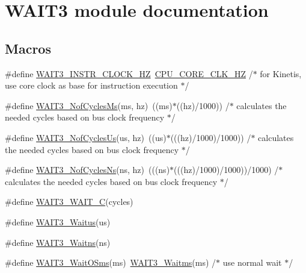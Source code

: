 \hypertarget{group___w_a_i_t3__module}{}\section{W\+A\+I\+T3 module documentation}
\label{group___w_a_i_t3__module}
\subsection*{Macros}
\begin{DoxyCompactItemize}
\item 
\#define \hyperlink{group___w_a_i_t3__module_ga704e840528cb3515b38c088da7dcf5e7}{W\+A\+I\+T3\+\_\+\+I\+N\+S\+T\+R\+\_\+\+C\+L\+O\+C\+K\+\_\+\+HZ}~\hyperlink{group___cpu__module_ga9dee0abd722c849e54c662ab11a1d2cf}{C\+P\+U\+\_\+\+C\+O\+R\+E\+\_\+\+C\+L\+K\+\_\+\+HZ} /$\ast$ for Kinetis, use core clock as base for instruction execution $\ast$/
\item 
\#define \hyperlink{group___w_a_i_t3__module_ga0161409e4b16cae22dad9e1a5c579d4f}{W\+A\+I\+T3\+\_\+\+Nof\+Cycles\+Ms}(ms,  hz)~((ms)$\ast$((hz)/1000)) /$\ast$ calculates the needed cycles based on bus clock frequency $\ast$/
\item 
\#define \hyperlink{group___w_a_i_t3__module_ga59aa53bfa203bca55c6cc0fee91ab3f3}{W\+A\+I\+T3\+\_\+\+Nof\+Cycles\+Us}(us,  hz)~((us)$\ast$(((hz)/1000)/1000)) /$\ast$ calculates the needed cycles based on bus clock frequency $\ast$/
\item 
\#define \hyperlink{group___w_a_i_t3__module_ga493da4e9ba3ac2a580caaaed67b772ba}{W\+A\+I\+T3\+\_\+\+Nof\+Cycles\+Ns}(ns,  hz)~(((ns)$\ast$(((hz)/1000)/1000))/1000) /$\ast$ calculates the needed cycles based on bus clock frequency $\ast$/
\item 
\#define \hyperlink{group___w_a_i_t3__module_ga7d40470fbdbc8b74536612340b0b2909}{W\+A\+I\+T3\+\_\+\+W\+A\+I\+T\+\_\+C}(cycles)
\item 
\#define \hyperlink{group___w_a_i_t3__module_ga3dbe29b13d5de3927ca05983aaa03d86}{W\+A\+I\+T3\+\_\+\+Waitus}(us)
\item 
\#define \hyperlink{group___w_a_i_t3__module_gac037988ca338a86fac9a40a96987d968}{W\+A\+I\+T3\+\_\+\+Waitns}(ns)
\item 
\#define \hyperlink{group___w_a_i_t3__module_ga0077724d419418a4cc3a53210bae6bf2}{W\+A\+I\+T3\+\_\+\+Wait\+O\+Sms}(ms)~\hyperlink{group___w_a_i_t3__module_ga19ada606148b3ddfb0bce574e8932ae8}{W\+A\+I\+T3\+\_\+\+Waitms}(ms) /$\ast$ use normal wait $\ast$/
\end{DoxyCompactItemize}
